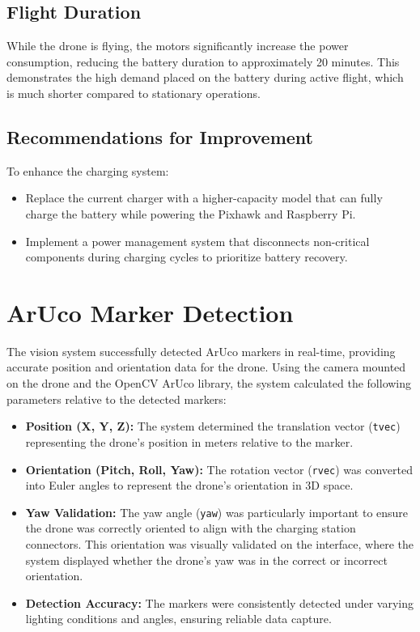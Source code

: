 \subsection{Flight Duration}

While the drone is flying, the motors significantly increase the power consumption, reducing the battery duration to approximately 20 minutes. This demonstrates the high demand placed on the battery during active flight, which is much shorter compared to stationary operations.

\subsection{Recommendations for Improvement}

To enhance the charging system:
\begin{itemize}
    \item Replace the current charger with a higher-capacity model that can fully charge the battery while powering the Pixhawk and Raspberry Pi.
    \item Implement a power management system that disconnects non-critical components during charging cycles to prioritize battery recovery.
\end{itemize}


\section{ArUco Marker Detection}

The vision system successfully detected ArUco markers in real-time, providing accurate position and orientation data for the drone. Using the camera mounted on the drone and the OpenCV ArUco library, the system calculated the following parameters relative to the detected markers:
\begin{itemize}
    \item \textbf{Position (X, Y, Z):} The system determined the translation vector (\texttt{tvec}) representing the drone's position in meters relative to the marker.
    \item \textbf{Orientation (Pitch, Roll, Yaw):} The rotation vector (\texttt{rvec}) was converted into Euler angles to represent the drone's orientation in 3D space.
    \item \textbf{Yaw Validation:} The yaw angle (\texttt{yaw}) was particularly important to ensure the drone was correctly oriented to align with the charging station connectors. This orientation was visually validated on the interface, where the system displayed whether the drone's yaw was in the correct or incorrect orientation.
    \item \textbf{Detection Accuracy:} The markers were consistently detected under varying lighting conditions and angles, ensuring reliable data capture.
\end{itemize}

